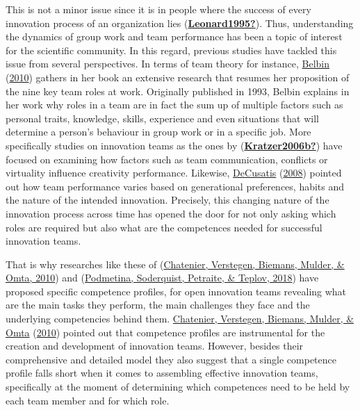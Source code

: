 \documentclass[]{elsarticle} %
\begin{document}
This is not a minor issue since it is in people where the success of
every innovation process of an organization lies
(\protect\hyperlink{ref-Leonard1995}{\textbf{Leonard1995?}}). Thus,
understanding the dynamics of group work and team performance has been a
topic of interest for the scientific community. In this regard, previous
studies have tackled this issue from several perspectives. In terms of
team theory for instance, \protect\hyperlink{ref-Belbin2010}{Belbin}
(\protect\hyperlink{ref-Belbin2010}{2010}) gathers in her book an
extensive research that resumes her proposition of the nine key team
roles at work. Originally published in 1993, Belbin explains in her work
why roles in a team are in fact the sum up of multiple factors such as
personal traits, knowledge, skills, experience and even situations that
will determine a person's behaviour in group work or in a specific job.
More specifically studies on innovation teams as the ones by
(\protect\hyperlink{ref-Kratzer2006b}{\textbf{Kratzer2006b?}}) have
focused on examining how factors such as team communication, conflicts
or virtuality influence creativity performance. Likewise,
\protect\hyperlink{ref-DeCusatis2008}{DeCusatis}
(\protect\hyperlink{ref-DeCusatis2008}{2008}) pointed out how team
performance varies based on generational preferences, habits and the
nature of the intended innovation. Precisely, this changing nature of
the innovation process across time has opened the door for not only
asking which roles are required but also what are the competences needed
for successful innovation teams.

That is why researches like these of
(\protect\hyperlink{ref-Chatenier2010}{Chatenier, Verstegen, Biemans,
Mulder, \& Omta, 2010}) and
(\protect\hyperlink{ref-Podmetina2018}{Podmetina, Soderquist, Petraite,
\& Teplov, 2018}) have proposed specific competence profiles, for open
innovation teams revealing what are the main tasks they perform, the
main challenges they face and the underlying competencies behind them.
\protect\hyperlink{ref-Chatenier2010}{Chatenier, Verstegen, Biemans,
Mulder, \& Omta} (\protect\hyperlink{ref-Chatenier2010}{2010}) pointed
out that competence profiles are instrumental for the creation and
development of innovation teams. However, besides their comprehensive
and detailed model they also suggest that a single competence profile
falls short when it comes to assembling effective innovation teams,
specifically at the moment of determining which competences need to be
held by each team member and for which role.
\end{document}
